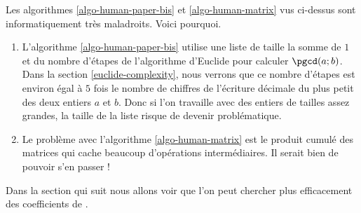 Les algorithmes \ref{algo-human-paper-bis} et \ref{algo-human-matrix} vus ci-dessus sont informatiquement très maladroits. Voici pourquoi.

\begin{enumerate}
	\item L'algorithme \ref{algo-human-paper-bis} utilise une liste de taille la somme de $1$ et du nombre d'étapes de l'algo\-rithme d'Euclide pour calculer $\pgcd(a ; b)$.
	Dans la section \ref{euclide-complexity}, nous verrons que ce nombre d'étapes est environ égal à $5$ fois le nombre de chiffres de l'écriture décimale du plus petit des deux entiers $a$ et $b$.
	Donc si l'on travaille avec des entiers de tailles assez grandes, la taille de la liste risque de devenir problématique.


	\item Le problème avec l'algorithme \ref{algo-human-matrix} est le produit cumulé des matrices qui cache beaucoup d'opérations intermédiaires. Il serait bien de pouvoir s'en passer !
\end{enumerate}

Dans la section qui suit nous allons voir que l'on peut chercher plus efficacement des coefficients de \bb{}.
